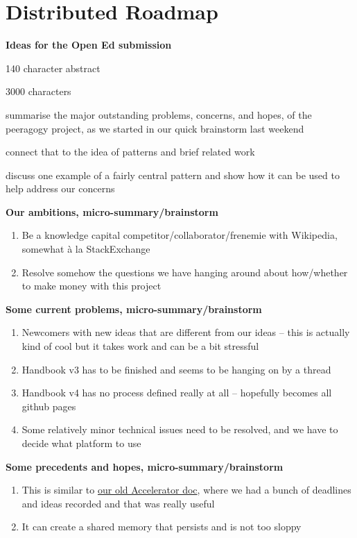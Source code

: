 \section{Distributed Roadmap}

\textbf{Ideas for the Open Ed submission}
\item 140 character abstract
\item 3000 characters
\item summarise the major outstanding problems, concerns, and hopes, of
   the peeragogy project, as we started in our quick brainstorm last
   weekend
\item connect that to the idea of patterns and brief related work
\item discuss one example of a fairly central pattern and show how it can be
   used to help address our concerns

\textbf{Our ambitions, micro-summary/brainstorm}
\begin{enumerate}
\item Be a knowledge capital competitor/collaborator/frenemie with Wikipedia, somewhat \`a la StackExchange
\item Resolve somehow the questions we have hanging around about how/whether to make money with this project 
\end{enumerate}

\textbf{Some current problems, micro-summary/brainstorm}
\begin{enumerate}
\item Newcomers with new ideas that are different from our ideas -- this is actually kind of cool but it takes work and can be a bit stressful
\item Handbook v3 has to be finished and seems to be hanging on by a thread
\item Handbook v4 has no process defined really at all -- hopefully becomes all github pages
\item Some relatively minor technical issues need to be resolved, and we have to decide what platform to use
\end{enumerate}

\textbf{Some precedents and hopes, micro-summary/brainstorm}
\begin{enumerate}
\item This is similar to \href{https://docs.google.com/document/d/1RZEsqFDwF-jPiCvgWzJgi6n6faTRTDuPQS1CMEeXxRE/edit#heading=h.p197njr3jsn8}{our old Accelerator doc}, where we had a bunch of deadlines and ideas recorded and that was really useful 
\item It can create a shared memory that persists and is not too sloppy
\end{enumerate}

